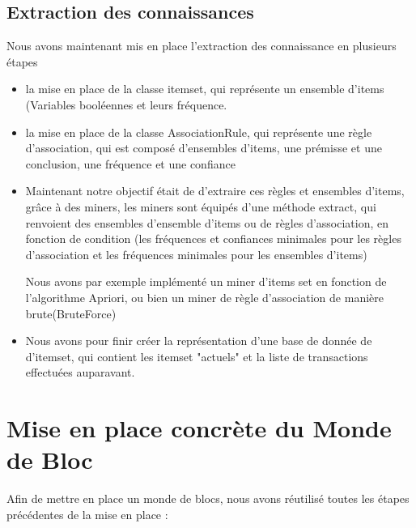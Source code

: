 \documentclass[12pt]{article}
\begin{document}
        \subsection{Extraction des connaissances}
                	Nous avons maintenant mis en place l'extraction des connaissance en plusieurs étapes

    	\begin{itemize}

    		\item la mise en place de la classe itemset, qui représente un ensemble d'items (Variables booléennes et leurs fréquence.

    		\item la mise en place de la classe AssociationRule, qui représente une règle d'association, qui est composé d'ensembles d'items, une prémisse et une conclusion, une fréquence et une confiance

    		\item Maintenant notre objectif était de d'extraire ces règles et ensembles d'items, grâce à des miners, les miners sont équipés d'une méthode extract, qui renvoient des ensembles d'ensemble d'items ou de règles d'association, en fonction de condition (les fréquences et confiances minimales pour les règles d'association et les fréquences minimales pour les ensembles d'items)

    		Nous avons par exemple implémenté un miner d'items set en fonction de l'algorithme Apriori, ou bien un miner de règle d'association de manière brute(BruteForce)

    		\item Nous avons pour finir créer la représentation d'une base de donnée de d'itemset, qui contient les itemset "actuels" et la liste de transactions effectuées auparavant.
            
		\end{itemize}
    \section{Mise en place concrète du Monde de Bloc}
        Afin de mettre en place un monde de blocs, nous avons réutilisé toutes les étapes précédentes de la mise en place :
\end{document}
